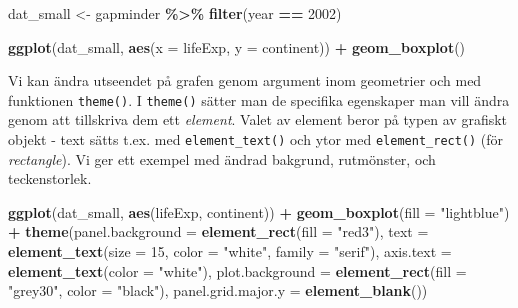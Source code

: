 \documentclass[
]{book}
\newenvironment{Shaded}{\begin{snugshade}}{\end{snugshade}}
\newcommand{\AttributeTok}[1]{\textcolor[rgb]{0.13,0.29,0.53}{#1}}
\newcommand{\DecValTok}[1]{\textcolor[rgb]{0.00,0.00,0.81}{#1}}
\newcommand{\FunctionTok}[1]{\textcolor[rgb]{0.13,0.29,0.53}{\textbf{#1}}}
\newcommand{\NormalTok}[1]{#1}
\newcommand{\OtherTok}[1]{\textcolor[rgb]{0.56,0.35,0.01}{#1}}
\newcommand{\SpecialCharTok}[1]{\textcolor[rgb]{0.81,0.36,0.00}{\textbf{#1}}}
\newcommand{\StringTok}[1]{\textcolor[rgb]{0.31,0.60,0.02}{#1}}
\theoremstyle{definition}
\theoremstyle{definition}
\theoremstyle{definition}
\theoremstyle{definition}
\theoremstyle{remark}
\begin{document}
\begin{Shaded}
\begin{Highlighting}[]
\NormalTok{dat\_small }\OtherTok{\textless{}{-}}\NormalTok{ gapminder }\SpecialCharTok{\%\textgreater{}\%} 
  \FunctionTok{filter}\NormalTok{(year }\SpecialCharTok{==} \DecValTok{2002}\NormalTok{)}

\FunctionTok{ggplot}\NormalTok{(dat\_small, }\FunctionTok{aes}\NormalTok{(}\AttributeTok{x =}\NormalTok{ lifeExp, }\AttributeTok{y =}\NormalTok{ continent)) }\SpecialCharTok{+} 
  \FunctionTok{geom\_boxplot}\NormalTok{()}
\end{Highlighting}
\end{Shaded}

Vi kan ändra utseendet på grafen genom argument inom geometrier och med funktionen \texttt{theme()}. I \texttt{theme()} sätter man de specifika egenskaper man vill ändra genom att tillskriva dem ett \emph{element}. Valet av element beror på typen av grafiskt objekt - text sätts t.ex. med \texttt{element\_text()} och ytor med \texttt{element\_rect()} (för \emph{rectangle}). Vi ger ett exempel med ändrad bakgrund, rutmönster, och teckenstorlek.

\begin{Shaded}
\begin{Highlighting}[]
\FunctionTok{ggplot}\NormalTok{(dat\_small, }\FunctionTok{aes}\NormalTok{(lifeExp, continent)) }\SpecialCharTok{+}
  \FunctionTok{geom\_boxplot}\NormalTok{(}\AttributeTok{fill =} \StringTok{"lightblue"}\NormalTok{) }\SpecialCharTok{+}
  \FunctionTok{theme}\NormalTok{(}\AttributeTok{panel.background =} \FunctionTok{element\_rect}\NormalTok{(}\AttributeTok{fill =} \StringTok{"red3"}\NormalTok{),}
        \AttributeTok{text =} \FunctionTok{element\_text}\NormalTok{(}\AttributeTok{size =} \DecValTok{15}\NormalTok{, }
                            \AttributeTok{color =} \StringTok{"white"}\NormalTok{, }\AttributeTok{family =} \StringTok{"serif"}\NormalTok{),}
        \AttributeTok{axis.text =} \FunctionTok{element\_text}\NormalTok{(}\AttributeTok{color =} \StringTok{"white"}\NormalTok{),}
        \AttributeTok{plot.background =} \FunctionTok{element\_rect}\NormalTok{(}\AttributeTok{fill =} \StringTok{"grey30"}\NormalTok{, }
                                       \AttributeTok{color =} \StringTok{"black"}\NormalTok{),}
        \AttributeTok{panel.grid.major.y =} \FunctionTok{element\_blank}\NormalTok{())}
\end{Highlighting}
\end{Shaded}
\end{document}
